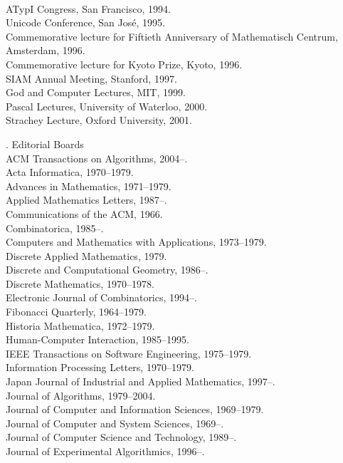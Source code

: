 \\ATypI Congress, San Francisco, 1994.
\\Unicode Conference, San Jos\'e, 1995.
\\Commemorative lecture for Fiftieth Anniversary of Mathematisch Centrum,
 Amsterdam, 1996.
\\Commemorative lecture for Kyoto Prize, Kyoto, 1996.
\\SIAM Annual Meeting, Stanford, 1997.
\\God and Computer Lectures, MIT, 1999.
\\Pascal Lectures, University of Waterloo, 2000.
\\Strachey Lecture, Oxford University, 2001.

. {Editorial Boards}
\\ACM Transactions on Algorithms, 2004--.
\\Acta Informatica, 1970--1979.
\\Advances in Mathematics, 1971--1979.
\\Applied Mathematics Letters, 1987--.
\\Communications of the ACM, 1966.
\\Combinatorica, 1985--.
\\Computers and Mathematics with Applications, 1973--1979.
\\Discrete Applied Mathematics, 1979.
\\Discrete and Computational Geometry, 1986--.
\\Discrete Mathematics, 1970--1978.
\\Electronic Journal of Combinatorics, 1994--.
\\Fibonacci Quarterly, 1964--1979.
\\Historia Mathematica, 1972--1979.
\\Human-Computer Interaction, 1985--1995.
\\IEEE Transactions on Software Engineering, 1975--1979.
\\Information Processing Letters, 1970--1979.
\\Japan Journal of Industrial and Applied Mathematics, 1997--.
\\Journal of Algorithms, 1979--2004.
\\Journal of Computer and Information Sciences, 1969--1979.
\\Journal of Computer and System Sciences, 1969--.
\\Journal of Computer Science and Technology, 1989--.
\\Journal of Experimental Algorithmics, 1996--.
